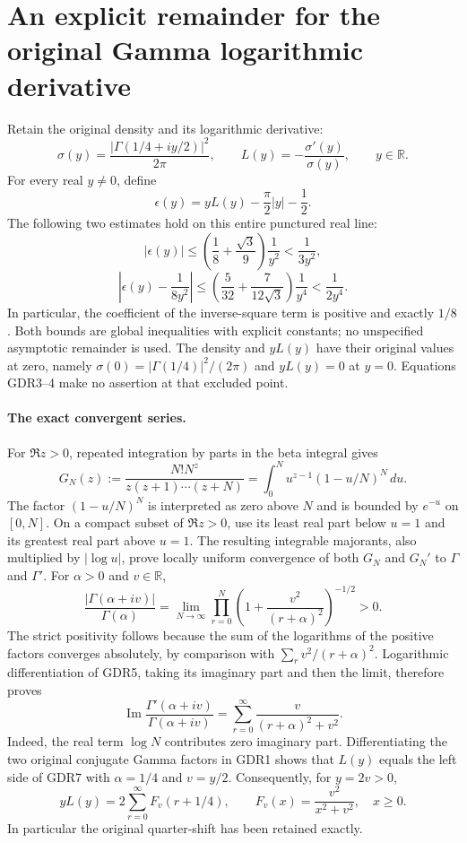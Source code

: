 \documentclass[11pt,a4paper]{article}
\begin{document}
\section{An explicit remainder for the original Gamma logarithmic derivative}
\label{sec:GDR}

Retain the original density and its logarithmic derivative:
\[
 \sigma(y)=\frac{|\Gamma(1/4+iy/2)|^2}{2\pi},\qquad
 L(y)=-\frac{\sigma'(y)}{\sigma(y)},\qquad y\in\mathbb R.
 \tag{GDR1}
\]
For every real $y\ne0$, define
\[
 \epsilon(y)=yL(y)-\frac\pi2|y|-\frac12.
 \tag{GDR2}
\]
The following two estimates hold on this entire punctured real line:
\[
 \boxed{\displaystyle
 |\epsilon(y)|\le
 \left(\frac18+\frac{\sqrt3}{9}\right)\frac1{y^2}
 <\frac1{3y^2},}
 \tag{GDR3}
\]
\[
 \boxed{\displaystyle
 \left|\epsilon(y)-\frac1{8y^2}\right|
 \le\left(\frac5{32}+\frac7{12\sqrt3}\right)\frac1{y^4}
 <\frac1{2y^4}.}
 \tag{GDR4}
\]
In particular, the coefficient of the inverse-square term is positive
and exactly $1/8$. Both bounds are global inequalities with explicit
constants; no unspecified asymptotic remainder is used. The density
and $yL(y)$ have their original values at zero, namely
$\sigma(0)=|\Gamma(1/4)|^2/(2\pi)$ and $yL(y)=0$ at $y=0$.
Equations GDR3--4 make no assertion at that excluded point.

\paragraph{The exact convergent series.}
For $\Re z>0$, repeated integration by parts in the beta integral gives
\[
 G_N(z):=\frac{N!N^z}{z(z+1)\cdots(z+N)}
 =\int_0^N u^{z-1}(1-u/N)^N\,du.
 \tag{GDR5}
\]
The factor $(1-u/N)^N$ is interpreted as zero above $N$ and is
bounded by $e^{-u}$ on $[0,N]$. On a compact subset of $\Re z>0$,
use its least real part below $u=1$ and its greatest real part above
$u=1$. The resulting integrable majorants, also multiplied by
$|\log u|$, prove locally uniform convergence of both $G_N$ and
$G_N'$ to $\Gamma$ and $\Gamma'$. For $\alpha>0$ and $v\in\mathbb R$,
\[
 \frac{|\Gamma(\alpha+iv)|}{\Gamma(\alpha)}
 =\lim_{N\to\infty}\prod_{r=0}^N
 \left(1+\frac{v^2}{(r+\alpha)^2}\right)^{-1/2}>0.
 \tag{GDR6}
\]
The strict positivity follows because the sum of the logarithms of
the positive factors converges absolutely, by comparison with
$\sum_r v^2/(r+\alpha)^2$. Logarithmic differentiation of GDR5,
taking its imaginary part and then the limit, therefore proves
\[
 \operatorname{Im}\frac{\Gamma'(\alpha+iv)}{\Gamma(\alpha+iv)}
 =\sum_{r=0}^{\infty}\frac{v}{(r+\alpha)^2+v^2}.
 \tag{GDR7}
\]
Indeed, the real term $\log N$ contributes zero imaginary part.
Differentiating the two original conjugate Gamma factors in GDR1
shows that $L(y)$ equals the left side of GDR7 with
$\alpha=1/4$ and $v=y/2$. Consequently, for $y=2v>0$,
\[
 yL(y)=2\sum_{r=0}^{\infty}F_v(r+1/4),\qquad
 F_v(x)=\frac{v^2}{x^2+v^2},\quad x\ge0.
 \tag{GDR8}
\]
In particular the original quarter-shift has been retained exactly.
\end{document}
